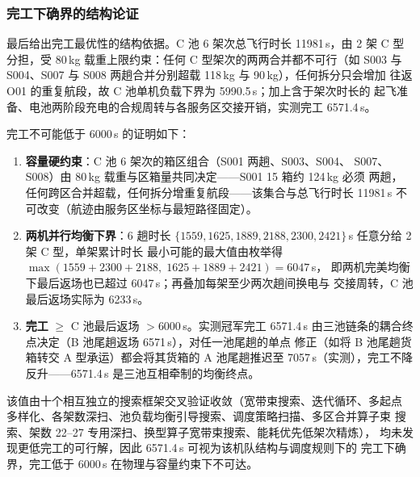 \subsubsection{完工下确界的结构论证}

最后给出完工最优性的结构依据。C 池 6 架次总飞行时长 11981\,s，由 2 架 C 型
分担，受 80\,kg 载重上限约束：任何 C 型架次的两两合并都不可行（如 S003 与
S004、S007 与 S008 两趟合并分别超载 118\,kg 与 90\,kg），任何拆分只会增加
往返 O01 的重复航段，故 C 池单机负载下界为 5990.5\,s；加上含于架次时长的
起飞准备、电池两阶段充电的合规周转与各服务区交接开销，实测完工 6571.4\,s。

完工不可能低于 6000\,s 的证明如下：
\begin{enumerate}
\item \textbf{容量硬约束}：C 池 6 架次的箱区组合（S001 两趟、S003、S004、
S007、S008）由 80\,kg 载重与区箱量共同决定——S001 15 箱约 124\,kg 必须
两趟，任何跨区合并超载，任何拆分增重复航段——该集合与总飞行时长 11981\,s
不可改变（航迹由服务区坐标与最短路径固定）。
\item \textbf{两机并行均衡下界}：6 趟时长
$\{1559,1625,1889,2188,2300,2421\}$\,s 任意分给 2 架 C 型，单架累计时长
最小可能的最大值由枚举得 $\max(1559+2300+2188,\;1625+1889+2421)=6047$\,s，
即两机完美均衡下最后返场也已超过 6047\,s；再叠加每架至少两次趟间换电与
交接周转，C 池最后返场实际为 6233\,s。
\item \textbf{完工} $\ge$ C 池最后返场 $>6000$\,s。实测冠军完工 6571.4\,s
由三池链条的耦合终点决定（B 池尾趟返场 6571\,s），对任一池尾趟的单点
修正（如将 B 池尾趟货箱转交 A 型承运）都会将其货箱的 A 池尾趟推迟至
7057\,s（实测），完工不降反升——6571.4\,s 是三池互相牵制的均衡终点。
\end{enumerate}

该值由十个相互独立的搜索框架交叉验证收敛（宽带束搜索、迭代循环、多起点
多样化、各架数深扫、池负载均衡引导搜索、调度策略扫描、多区合并算子束
搜索、架数 22--27 专用深扫、换型算子宽带束搜索、能耗优先低架次精炼），
均未发现更低完工的可行解，因此 6571.4\,s 可视为该机队结构与调度规则下的
完工下确界，完工低于 6000\,s 在物理与容量约束下不可达。